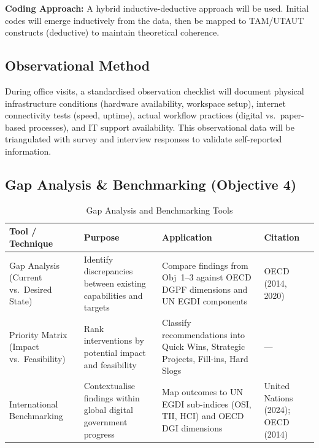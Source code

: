 \documentclass[12pt,a4paper]{article}
\begin{document}
\textbf{Coding Approach:} A hybrid inductive-deductive approach will be used. Initial codes will emerge inductively from the data, then be mapped to TAM/UTAUT constructs (deductive) to maintain theoretical coherence.

\subsection{Observational Method}

During office visits, a standardised observation checklist will document physical infrastructure conditions (hardware availability, workspace setup), internet connectivity tests (speed, uptime), actual workflow practices (digital vs.\ paper-based processes), and IT support availability. This observational data will be triangulated with survey and interview responses to validate self-reported information.

\subsection{Gap Analysis \& Benchmarking (Objective 4)}

\begin{table}[H]
\centering
\caption{Gap Analysis and Benchmarking Tools}
\small
\begin{tabularx}{\textwidth}{L{3.2cm} L{2.8cm} X L{2.8cm}}
\toprule
\textbf{Tool / Technique} & \textbf{Purpose} & \textbf{Application} & \textbf{Citation} \\
\midrule
Gap Analysis (Current vs.\ Desired State) & Identify discrepancies between existing capabilities and targets & Compare findings from Obj~1--3 against OECD DGPF dimensions and UN EGDI components & OECD (2014, 2020) \\[6pt]
Priority Matrix (Impact vs.\ Feasibility) & Rank interventions by potential impact and feasibility & Classify recommendations into Quick Wins, Strategic Projects, Fill-ins, Hard Slogs & --- \\[6pt]
International Benchmarking & Contextualise findings within global digital government progress & Map outcomes to UN EGDI sub-indices (OSI, TII, HCI) and OECD DGI dimensions & United Nations (2024); OECD (2014) \\
\bottomrule
\end{tabularx}
\end{table}

\newpage

\end{document}

